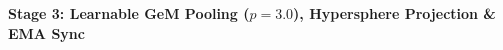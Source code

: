 \documentclass[preview]{standalone}
\begin{document}
\begin{center}
\textbf{Stage 3: Learnable GeM Pooling ($p=3.0$), Hypersphere Projection \& EMA Sync}
\end{center}
\end{document}
